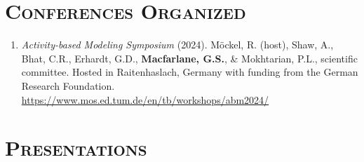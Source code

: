 \documentclass[margin,line]{res}
\newif\ifdetail
\newcounter{enuminitialize}
\newenvironment{myenum}[1][]
{%
 \setcounter{enuminitialize}{#1}
 \addtocounter{enuminitialize}{2}
 \begin{enumerate}[left= 4pt, itemsep=8pt, start=\value{enuminitialize}, label=\arabic*\addtocounter{enumi}{-2}]
}
{%
 \end{enumerate}
}
\newcommand{\secfont}{\scshape }
\begin{document}
\begin{resume}
\noindent\makebox[\linewidth]{\rule{\linewidth}{0.4pt}}
\section{\secfont Conferences Organized}
\ifdetail
This includes conferences and symposia for which I served on an organizing or
scientific committee.
\fi
\vspace{0.3cm}

\begin{myenum}[1]
  \ifdetail {\color{NavyBlue} \fi
  \item{\textit{Activity-based Modeling Symposium} (2024). M\"ockel, R. (host),  Shaw, A., Bhat, C.R., Erhardt, G.D.,  \textbf{Macfarlane, G.S.}, \& Mokhtarian, P.L., scientific committee.   Hosted in Raitenhaslach, Germany with funding from the German Research Foundation. \url{https://www.mos.ed.tum.de/en/tb/workshops/abm2024/}}
  \ifdetail } \fi
\end{myenum}  

\noindent\makebox[\linewidth]{\rule{\linewidth}{0.4pt}}
\section{\secfont Presentations}
\ifdetail This includes invited presentations to academic and non-academic audiences, as
well as presentations resulting from abstract-only submission. Includes both
lectern sessions and posters. Item 1 came from my undergraduate honors thesis, items 2 through 4 from doctoral research,
items 5 through 10 from my work as a consultant, and items 11 through the present represent work
completed during my time at BYU.\fi

\vspace{0.3cm}




\end{resume}
\end{document}
